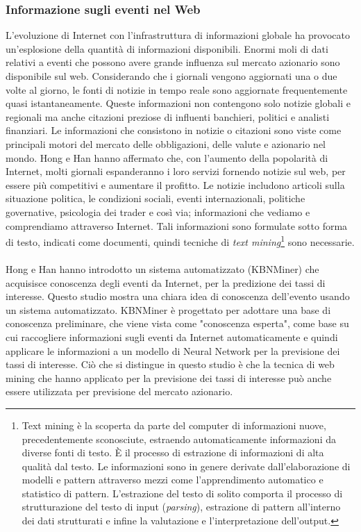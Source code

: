 \documentclass[a4paper,12pt]{report}
\begin{document}
\subsubsection{Informazione sugli eventi nel Web}
L'evoluzione di Internet con l'infrastruttura di informazioni globale ha provocato un'esplosione della quantità di informazioni disponibili. Enormi moli di dati relativi a eventi che possono avere grande influenza sul mercato azionario sono disponibile sul web. Considerando che i giornali vengono aggiornati una o due volte al giorno, le fonti di notizie in tempo reale sono aggiornate frequentemente quasi istantaneamente. Queste informazioni non contengono solo notizie globali e regionali ma anche citazioni preziose di influenti banchieri, politici e analisti finanziari. Le informazioni che consistono in notizie o citazioni sono viste come principali motori del mercato delle obbligazioni, delle valute e azionario nel mondo. Hong e Han \cite{13} hanno affermato che, con l'aumento della popolarità di Internet, molti giornali espanderanno i loro servizi fornendo notizie sul web, per essere più competitivi e aumentare il profitto. Le notizie includono articoli sulla situazione politica, le condizioni sociali, eventi internazionali, politiche governative, psicologia dei trader e così via; informazioni che vediamo e comprendiamo attraverso Internet. Tali informazioni sono formulate sotto forma di testo, indicati come documenti, quindi tecniche di \textit{text mining}\footnote{Text mining è la scoperta da parte del computer di informazioni nuove, precedentemente sconosciute, estraendo automaticamente informazioni da diverse fonti di testo.	È il processo di estrazione di informazioni di alta qualità dal testo. Le informazioni sono in genere derivate dall'elaborazione di modelli e pattern attraverso mezzi come l'apprendimento automatico e statistico di pattern. L'estrazione del testo di solito comporta il processo di strutturazione del testo di input (\textit{parsing}), estrazione di pattern all'interno dei dati strutturati e infine la valutazione e l'interpretazione dell'output.} sono necessarie.\\~\\
Hong e Han \cite{13} hanno introdotto un sistema automatizzato (KBNMiner) che acquisisce conoscenza degli eventi da Internet, per la predizione dei tassi di interesse. Questo studio
mostra una chiara idea di conoscenza dell'evento usando un sistema automatizzato. KBNMiner è progettato per adottare una base di conoscenza preliminare, che viene vista come "conoscenza esperta", come base su cui raccogliere informazioni sugli eventi da Internet automaticamente e quindi applicare le informazioni a un modello di Neural Network per la previsione dei tassi di interesse. Ciò che si distingue in questo studio è che la tecnica di web mining che hanno applicato per la previsione dei tassi di interesse può anche essere utilizzata per previsione del mercato azionario.
\end{document}
